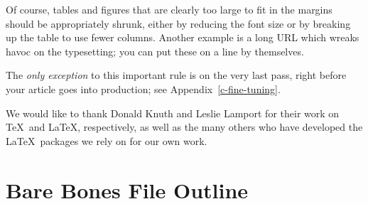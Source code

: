 \documentclass[openany]{now} %
\begin{document}
Of course, tables and figures that are clearly too large to fit in
the margins should be appropriately shrunk, either by reducing the font size or
by breaking up the table to use fewer columns. Another example is a long URL
which wreaks havoc on the typesetting; you can put these on a line by
themselves.

The \emph{only exception} to this important rule is on the very last pass, 
right before your article goes into production; see Appendix~\ref{c-fine-tuning}.


\begin{acknowledgements}
We would like to thank Donald Knuth and Leslie Lamport for their work
on \TeX\ and \LaTeX, respectively, as well as the many others who
have developed the \LaTeX\ packages we rely on for our own work.
\end{acknowledgements}

\appendix

\chapter{Bare Bones File Outline}
\label{s-bare-bones}
\end{document}
